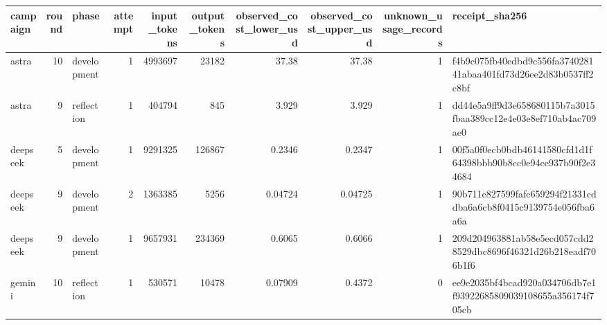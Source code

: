 \begin{tabular}{lrlrrrrrrl}
\toprule
campaign & round & phase & attempt & input\_tokens & output\_tokens & observed\_cost\_lower\_usd & observed\_cost\_upper\_usd & unknown\_usage\_records & receipt\_sha256 \\
\midrule
astra & 10 & development & 1 & 4993697 & 23182 & 37.38 & 37.38 & 1 & f4b9c075fb40edbd9c556fa374028141abaa401fd73d26ee2d83b0537ff2c8bf \\
astra & 9 & reflection & 1 & 404794 & 845 & 3.929 & 3.929 & 1 & dd44e5a9ff9d3e658680115b7a3015fbaa389cc12e4e03e8ef710ab4ac709ae0 \\
deepseek & 5 & development & 1 & 9291325 & 126867 & 0.2346 & 0.2347 & 1 & 00f5a0f0ecb0bdb46141580cfd1d1f64398bbb90b8cc0e94ce937b90f2e34684 \\
deepseek & 9 & development & 2 & 1363385 & 5256 & 0.04724 & 0.04725 & 1 & 90b711c827599fafc659294f21331cddba6a6cb8f0415c9139754e056fba6a6a \\
deepseek & 9 & development & 1 & 9657931 & 234369 & 0.6065 & 0.6066 & 1 & 209d204963881ab58e5ecd057cdd28529dbc8696f46321d26b218eadf706b1f6 \\
gemini & 10 & reflection & 1 & 530571 & 10478 & 0.07909 & 0.4372 & 0 & ee9e2035bf4bcad920a034706db7e1f93922685809039108655a356174f705cb \\
\bottomrule
\end{tabular}

